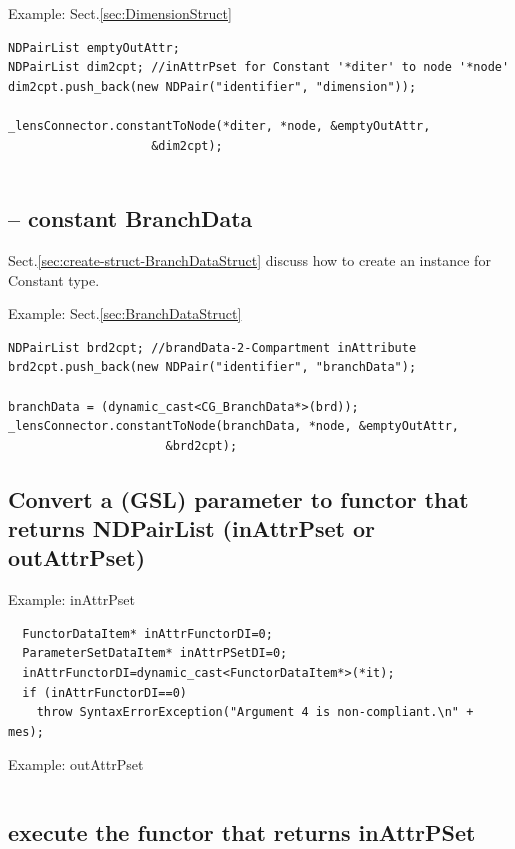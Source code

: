 Example: Sect.\ref{sec:DimensionStruct}
\begin{verbatim}
NDPairList emptyOutAttr;
NDPairList dim2cpt; //inAttrPset for Constant '*diter' to node '*node'
dim2cpt.push_back(new NDPair("identifier", "dimension"));

_lensConnector.constantToNode(*diter, *node, &emptyOutAttr,
                    &dim2cpt);


\end{verbatim}

\subsection{-- constant BranchData}
\label{sec:connect-constant-BranchData-to-node}

Sect.\ref{sec:create-struct-BranchDataStruct} discuss how to create an instance for
Constant type.

Example: Sect.\ref{sec:BranchDataStruct}
\begin{verbatim}
NDPairList brd2cpt; //brandData-2-Compartment inAttribute
brd2cpt.push_back(new NDPair("identifier", "branchData");

branchData = (dynamic_cast<CG_BranchData*>(brd));
_lensConnector.constantToNode(branchData, *node, &emptyOutAttr,
                      &brd2cpt);
\end{verbatim}

\subsection{Convert a (GSL) parameter to functor that returns NDPairList
(inAttrPset or outAttrPset)}

Example: inAttrPset
\begin{lstlisting}
  FunctorDataItem* inAttrFunctorDI=0;
  ParameterSetDataItem* inAttrPSetDI=0;
  inAttrFunctorDI=dynamic_cast<FunctorDataItem*>(*it);    
  if (inAttrFunctorDI==0)
    throw SyntaxErrorException("Argument 4 is non-compliant.\n" + mes);
\end{lstlisting}


Example: outAttrPset
\begin{lstlisting}

\end{lstlisting}

\subsection{execute the functor that returns inAttrPSet}

